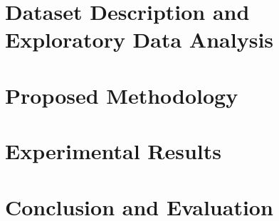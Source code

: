 \documentclass{article}
\begin{document}
\section{Dataset Description and Exploratory Data Analysis} 
\section{Proposed Methodology} 
\section{Experimental Results} 
\section{Conclusion and Evaluation} 
 
\end{document}

